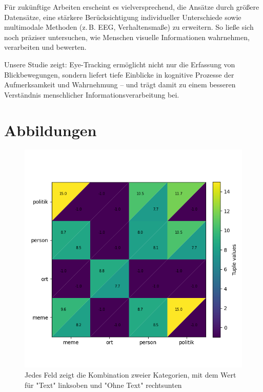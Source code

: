 \documentclass[
    language=german, %
    thesis=seminar, %
    supervisor=postdoc, %
    multiauthor=true, %
    ]{settings/csssa-thesis}
\begin{document}
Für zukünftige Arbeiten erscheint es vielversprechend, die Ansätze durch größere Datensätze, 
eine stärkere Berücksichtigung individueller Unterschiede sowie multimodale Methoden (z.\,B. EEG, 
Verhaltensmaße) zu erweitern. So ließe sich noch präziser untersuchen, wie Menschen visuelle 
Informationen wahrnehmen, verarbeiten und bewerten.  

Unsere Studie zeigt: Eye-Tracking ermöglicht nicht nur die Erfassung von Blickbewegungen, 
sondern liefert tiefe Einblicke in kognitive Prozesse der Aufmerksamkeit und Wahrnehmung – 
und trägt damit zu einem besseren Verständnis menschlicher Informationsverarbeitung bei. 


\newpage
\printbibliography[heading=header]

\clearpage
\appendix
\section{Abbildungen}


\begin{figure}[htbp]
    \centering
    \includegraphics[width=0.8\linewidth,height=0.8\textheight,keepaspectratio]{figures/Bild3.png}
    \caption{Jedes Feld zeigt die Kombination zweier Kategorien, mit dem Wert für "Text" linksoben und "Ohne Text" rechtsunten}\label{fig:katMatrix}
\end{figure}
\end{document}
